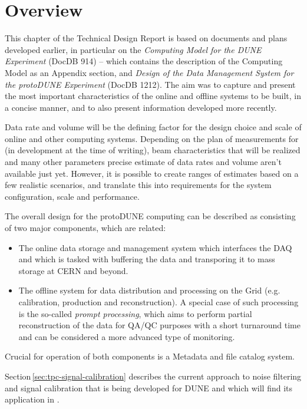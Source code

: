 \section{Overview}

This chapter of the Technical Design Report is based on documents and plans developed earlier, in particular
on the \textit{Computing Model for the DUNE Experiment} (DocDB 914) -- which contains the description
of the \pd Computing Model as an Appendix section, and \textit{Design of the Data Management System for the protoDUNE Experiment}
(DocDB 1212). The aim was to capture and present the most important characteristics of the online and offline systems to be built, in a concise manner,
and to also present information developed more recently.

Data rate and volume will be the defining factor for the design choice and scale of \pd online and other computing systems.
Depending on the plan of measurements for \pd
(in development at the time of writing), beam characteristics that will be realized
and many other parameters precise estimate of data rates and volume aren't available just yet. However, it is possible to create ranges
of estimates based on a few realistic scenarios, and translate this into requirements for the system configuration, scale and
performance.

The overall design for the protoDUNE computing can be described as consisting of two major components, which are related:
\begin{itemize}
\item The online data storage and management system which interfaces the DAQ and which is tasked with buffering
the data and transporing it to mass storage at CERN and beyond.
\item The offline system for data distribution and processing on the Grid (e.g. calibration, production and reconstruction). A special case
of such processing is the so-called \textit{prompt processing}, which aims to perform partial reconstruction of the data for QA/QC purposes
with a short turnaround time and can be considered a more advanced type of monitoring.
\end{itemize}

\noindent Crucial for operation of both components is a Metadata and file catalog system.

Section\,\ref{sec:tpc-signal-calibration} describes the current approach to noise filtering and signal calibration that is being
developed for DUNE and which will find its application in \pd.


